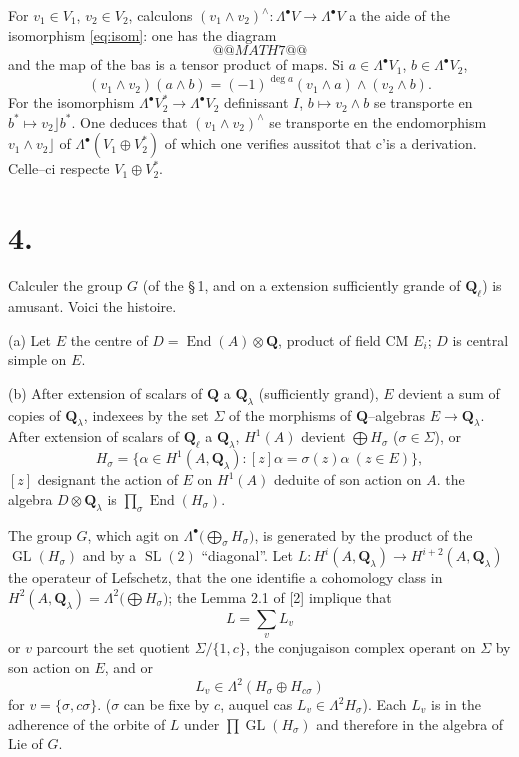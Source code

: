 \documentclass[11pt,a4paper]{article}
\theoremstyle{plain}
\theoremstyle{definition}
\DeclareMathOperator{\End}{End}
\DeclareMathOperator{\SL}{SL}
\DeclareMathOperator{\GL}{GL}
\begin{document}
For $v_1 \in V_1$, $v_2 \in V_2$, calculons $(v_1 \wedge v_2)^\wedge : \Lambda^\bullet V \to \Lambda^\bullet V$ a the aide of the isomorphism \eqref{eq:isom}: one has the diagram
\[
@@MATH7@@
\]
and the map of the bas is a tensor product of maps. Si $a \in \Lambda^\bullet V_1$, $b \in \Lambda^\bullet V_2$,
\[
(v_1 \wedge v_2)(a \wedge b) = (-1)^{\deg a} (v_1 \wedge a) \wedge (v_2 \wedge b) .
\]
For the isomorphism $\Lambda^\bullet V_2^* \to \Lambda^\bullet V_2$ definissant $I$, $b \mapsto v_2 \wedge b$ se transporte en $b^* \mapsto v_2 \rfloor b^*$. One deduces that $(v_1 \wedge v_2)^\wedge$ se transporte en the endomorphism $v_1 \wedge v_2 \rfloor$ of $\Lambda^\bullet(V_1 \oplus V_2^*)$ of which one verifies aussitot that c'is a derivation. Celle--ci respecte $V_1 \oplus V_2^*$.

\section*{4.}

Calculer the group $G$ (of the \S\,1, and on a extension sufficiently grande of $\mathbf{Q}_\ell$) is amusant. Voici the histoire.

(a) Let $E$ the centre of $D = \End(A) \otimes \mathbf{Q}$, product of field CM $E_i$; $D$ is central simple on $E$.

(b) After extension of scalars of $\mathbf{Q}$ a $\mathbf{Q}_\lambda$ (sufficiently grand), $E$ devient a sum of copies of $\mathbf{Q}_\lambda$, indexees by the set $\Sigma$ of the morphisms of $\mathbf{Q}$--algebras $E \to \mathbf{Q}_\lambda$. After extension of scalars of $\mathbf{Q}_\ell$ a $\mathbf{Q}_\lambda$, $H^1(A)$ devient $\bigoplus H_\sigma$ ($\sigma \in \Sigma$), or
\[
H_\sigma = \{\alpha \in H^1(A, \mathbf{Q}_\lambda) : [z]\alpha = \sigma(z)\alpha \ (z \in E)\} ,
\]
$[z]$ designant the action of $E$ on $H^1(A)$ deduite of son action on $A$. the algebra $D \otimes \mathbf{Q}_\lambda$ is $\prod_\sigma \End(H_\sigma)$.

The group $G$, which agit on $\Lambda^\bullet\bigl(\bigoplus_\sigma H_\sigma\bigr)$, is generated by the product of the $\GL(H_\sigma)$ and by a $\SL(2)$ ``diagonal''. Let $L : H^i(A, \mathbf{Q}_\lambda) \to H^{i+2}(A, \mathbf{Q}_\lambda)$ the operateur of Lefschetz, that the one identifie a cohomology class in $H^2(A, \mathbf{Q}_\lambda) = \Lambda^2\bigl(\bigoplus H_\sigma\bigr)$; the Lemma 2.1 of [2] implique that
\[
L = \sum_v L_v
\]
or $v$ parcourt the set quotient $\Sigma/\{1, c\}$, the conjugaison complex operant on $\Sigma$ by son action on $E$, and or
\[
L_v \in \Lambda^2(H_\sigma \oplus H_{c\sigma})
\]
for $v = \{\sigma, c\sigma\}$. ($\sigma$ can be fixe by $c$, auquel cas $L_v \in \Lambda^2 H_\sigma$). Each $L_v$ is in the adherence of the orbite of $L$ under $\prod \GL(H_\sigma)$ and therefore in the algebra of Lie of $G$.
\end{document}
